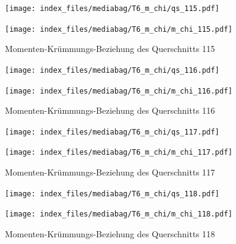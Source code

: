 \documentclass[
  11pt,
  letterpaper,
]{scrreprt}
\begin{document}
\begin{figure}[H]

\begin{minipage}{0.50\linewidth}
\texttt{[image: index\_files/mediabag/T6\_m\_chi/qs\_115.pdf]}\end{minipage}%
%
\begin{minipage}{0.50\linewidth}
\texttt{[image: index\_files/mediabag/T6\_m\_chi/m\_chi\_115.pdf]}\end{minipage}%

\caption{\label{fig-m_chi_appendix}Momenten-Krümmungs-Beziehung des
Querschnitts 115}

\end{figure}%

\begin{figure}[H]

\begin{minipage}{0.50\linewidth}
\texttt{[image: index\_files/mediabag/T6\_m\_chi/qs\_116.pdf]}\end{minipage}%
%
\begin{minipage}{0.50\linewidth}
\texttt{[image: index\_files/mediabag/T6\_m\_chi/m\_chi\_116.pdf]}\end{minipage}%

\caption{\label{fig-m_chi_appendix}Momenten-Krümmungs-Beziehung des
Querschnitts 116}

\end{figure}%

\begin{figure}[H]

\begin{minipage}{0.50\linewidth}
\texttt{[image: index\_files/mediabag/T6\_m\_chi/qs\_117.pdf]}\end{minipage}%
%
\begin{minipage}{0.50\linewidth}
\texttt{[image: index\_files/mediabag/T6\_m\_chi/m\_chi\_117.pdf]}\end{minipage}%

\caption{\label{fig-m_chi_appendix}Momenten-Krümmungs-Beziehung des
Querschnitts 117}

\end{figure}%

\begin{figure}[H]

\begin{minipage}{0.50\linewidth}
\texttt{[image: index\_files/mediabag/T6\_m\_chi/qs\_118.pdf]}\end{minipage}%
%
\begin{minipage}{0.50\linewidth}
\texttt{[image: index\_files/mediabag/T6\_m\_chi/m\_chi\_118.pdf]}\end{minipage}%

\caption{\label{fig-m_chi_appendix}Momenten-Krümmungs-Beziehung des
Querschnitts 118}

\end{figure}%
\end{document}
